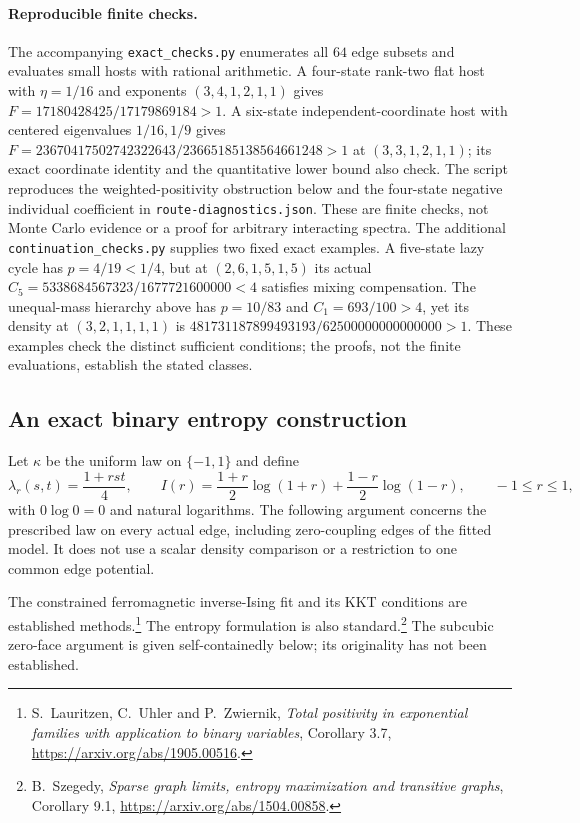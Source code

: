 \paragraph{Reproducible finite checks.}
The accompanying \texttt{exact\_checks.py} enumerates all $64$ edge subsets
and evaluates small hosts with rational arithmetic.  A four-state rank-two
flat host with $\eta=1/16$ and exponents $(3,4,1,2,1,1)$ gives
$F=17180428425/17179869184>1$.  A six-state independent-coordinate host
with centered eigenvalues $1/16,1/9$ gives
$F=23670417502742322643/23665185138564661248>1$ at
$(3,3,1,2,1,1)$; its exact coordinate identity and the quantitative lower
bound also check.  The script reproduces the weighted-positivity obstruction
below and the four-state negative individual coefficient in
\texttt{route-diagnostics.json}.  These are finite checks, not Monte Carlo
evidence or a proof for arbitrary interacting spectra.
The additional \texttt{continuation\_checks.py} supplies two fixed exact
examples.  A five-state lazy cycle has $p=4/19<1/4$, but at
$(2,6,1,5,1,5)$ its actual $C_5=5338684567323/1677721600000<4$
satisfies mixing compensation.  The unequal-mass hierarchy above has
$p=10/83$ and $C_1=693/100>4$, yet its density at $(3,2,1,1,1,1)$ is
$481731187899493193/62500000000000000>1$.  These examples check the
distinct sufficient conditions; the proofs, not the finite evaluations,
establish the stated classes.

\subsection{An exact binary entropy construction}

Let $\kappa$ be the uniform law on $\{-1,1\}$ and define
\[
 \lambda_r(s,t)=\frac{1+rst}{4},\qquad
 I(r)=\frac{1+r}{2}\log(1+r)+\frac{1-r}{2}\log(1-r),
 \qquad -1\leq r\leq1,
\]
with $0\log0=0$ and natural logarithms.  The following argument concerns
the prescribed law on every actual edge, including zero-coupling edges of
the fitted model.  It does not use a scalar density comparison or a
restriction to one common edge potential.

The constrained ferromagnetic inverse-Ising fit and its KKT conditions are
established methods.\footnote{S.~Lauritzen, C.~Uhler and P.~Zwiernik,
\emph{Total positivity in exponential families with application to binary
variables}, Corollary 3.7, \url{https://arxiv.org/abs/1905.00516}.}
The entropy formulation is also standard.\footnote{B.~Szegedy,
\emph{Sparse graph limits, entropy maximization and transitive graphs},
Corollary 9.1, \url{https://arxiv.org/abs/1504.00858}.}
The subcubic zero-face argument is given self-containedly below; its
originality has not been established.

